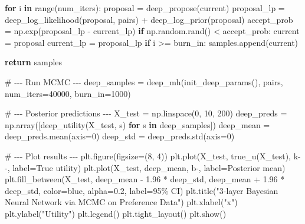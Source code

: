\documentclass[
  letterpaper,
  numbers=noenddot,
  DIV=11]{scrreprt}
\newenvironment{Shaded}{\begin{snugshade}}{\end{snugshade}}
\newcommand{\BuiltInTok}[1]{\textcolor[rgb]{0.00,0.23,0.31}{#1}}
\newcommand{\CommentTok}[1]{\textcolor[rgb]{0.37,0.37,0.37}{#1}}
\newcommand{\ControlFlowTok}[1]{\textcolor[rgb]{0.00,0.23,0.31}{\textbf{#1}}}
\newcommand{\DecValTok}[1]{\textcolor[rgb]{0.68,0.00,0.00}{#1}}
\newcommand{\FloatTok}[1]{\textcolor[rgb]{0.68,0.00,0.00}{#1}}
\newcommand{\KeywordTok}[1]{\textcolor[rgb]{0.00,0.23,0.31}{\textbf{#1}}}
\newcommand{\NormalTok}[1]{\textcolor[rgb]{0.00,0.23,0.31}{#1}}
\newcommand{\OperatorTok}[1]{\textcolor[rgb]{0.37,0.37,0.37}{#1}}
\newcommand{\StringTok}[1]{\textcolor[rgb]{0.13,0.47,0.30}{#1}}
\theoremstyle{plain}
\theoremstyle{definition}
\theoremstyle{remark}
\begin{document}
\begin{Shaded}
\begin{Highlighting}[numbers=left,,]
    \ControlFlowTok{for}\NormalTok{ i }\KeywordTok{in} \BuiltInTok{range}\NormalTok{(num\_iters):}
\NormalTok{        proposal }\OperatorTok{=}\NormalTok{ deep\_propose(current)}
\NormalTok{        proposal\_lp }\OperatorTok{=}\NormalTok{ deep\_log\_likelihood(proposal, pairs) }\OperatorTok{+}\NormalTok{ deep\_log\_prior(proposal)}
\NormalTok{        accept\_prob }\OperatorTok{=}\NormalTok{ np.exp(proposal\_lp }\OperatorTok{{-}}\NormalTok{ current\_lp)}
        \ControlFlowTok{if}\NormalTok{ np.random.rand() }\OperatorTok{\textless{}}\NormalTok{ accept\_prob:}
\NormalTok{            current }\OperatorTok{=}\NormalTok{ proposal}
\NormalTok{            current\_lp }\OperatorTok{=}\NormalTok{ proposal\_lp}
        \ControlFlowTok{if}\NormalTok{ i }\OperatorTok{\textgreater{}=}\NormalTok{ burn\_in:}
\NormalTok{            samples.append(current)}

    \ControlFlowTok{return}\NormalTok{ samples}

\CommentTok{\# {-}{-}{-} Run MCMC {-}{-}{-}}
\NormalTok{deep\_samples }\OperatorTok{=}\NormalTok{ deep\_mh(init\_deep\_params(), pairs, num\_iters}\OperatorTok{=}\DecValTok{40000}\NormalTok{, burn\_in}\OperatorTok{=}\DecValTok{1000}\NormalTok{)}

\CommentTok{\# {-}{-}{-} Posterior predictions {-}{-}{-}}
\NormalTok{X\_test }\OperatorTok{=}\NormalTok{ np.linspace(}\DecValTok{0}\NormalTok{, }\DecValTok{10}\NormalTok{, }\DecValTok{200}\NormalTok{)}
\NormalTok{deep\_preds }\OperatorTok{=}\NormalTok{ np.array([deep\_utility(X\_test, s) }\ControlFlowTok{for}\NormalTok{ s }\KeywordTok{in}\NormalTok{ deep\_samples])}
\NormalTok{deep\_mean }\OperatorTok{=}\NormalTok{ deep\_preds.mean(axis}\OperatorTok{=}\DecValTok{0}\NormalTok{)}
\NormalTok{deep\_std }\OperatorTok{=}\NormalTok{ deep\_preds.std(axis}\OperatorTok{=}\DecValTok{0}\NormalTok{)}

\CommentTok{\# {-}{-}{-} Plot results {-}{-}{-}}
\NormalTok{plt.figure(figsize}\OperatorTok{=}\NormalTok{(}\DecValTok{8}\NormalTok{, }\DecValTok{4}\NormalTok{))}
\NormalTok{plt.plot(X\_test, true\_u(X\_test), }\StringTok{\textquotesingle{}k{-}{-}\textquotesingle{}}\NormalTok{, label}\OperatorTok{=}\StringTok{\textquotesingle{}True utility\textquotesingle{}}\NormalTok{)}
\NormalTok{plt.plot(X\_test, deep\_mean, }\StringTok{\textquotesingle{}b{-}\textquotesingle{}}\NormalTok{, label}\OperatorTok{=}\StringTok{\textquotesingle{}Posterior mean\textquotesingle{}}\NormalTok{)}
\NormalTok{plt.fill\_between(X\_test, deep\_mean }\OperatorTok{{-}} \FloatTok{1.96} \OperatorTok{*}\NormalTok{ deep\_std, deep\_mean }\OperatorTok{+} \FloatTok{1.96} \OperatorTok{*}\NormalTok{ deep\_std,}
\NormalTok{                 color}\OperatorTok{=}\StringTok{\textquotesingle{}blue\textquotesingle{}}\NormalTok{, alpha}\OperatorTok{=}\FloatTok{0.2}\NormalTok{, label}\OperatorTok{=}\StringTok{\textquotesingle{}95\% CI\textquotesingle{}}\NormalTok{)}
\NormalTok{plt.title(}\StringTok{"3{-}layer Bayesian Neural Network via MCMC on Preference Data"}\NormalTok{)}
\NormalTok{plt.xlabel(}\StringTok{"x"}\NormalTok{)}
\NormalTok{plt.ylabel(}\StringTok{"Utility"}\NormalTok{)}
\NormalTok{plt.legend()}
\NormalTok{plt.tight\_layout()}
\NormalTok{plt.show()}


\end{Highlighting}
\end{Shaded}
\end{document}
